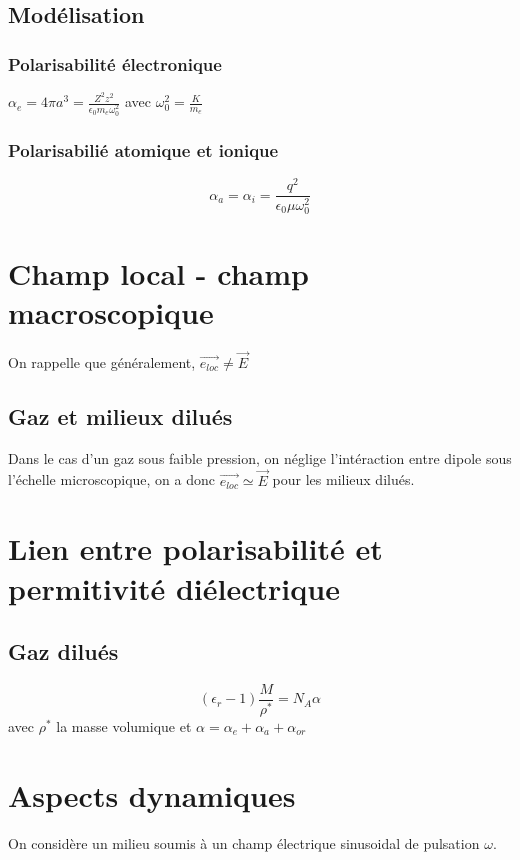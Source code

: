 \documentclass[french]{yLectureNote}
\renewcommand{\vec}{\overrightarrow}
\begin{document}
\subsection{Modélisation}
\subsubsection{Polarisabilité électronique}
\begin{theorem}
    $\alpha_e = 4\pi a^3 = \frac{Z^2z^2}{\epsilon_0m_e\omega_0^2}$ avec $\omega_0^2 = \frac{K}{m_e}$
\end{theorem}
\subsubsection{Polarisabilié atomique et ionique}
\begin{theorem}
    $$\alpha_a = \alpha_i = \frac{q^2}{\epsilon_0\mu \omega_0^2}$$
\end{theorem}

\section{Champ local - champ macroscopique}
On rappelle que généralement, $\vec{e_{loc}}\neq \vec{E}$
\subsection{Gaz et milieux dilués}
Dans le cas d'un gaz sous faible pression, on néglige l'intéraction entre dipole sous l'échelle microscopique, on a donc 
$\vec{e_{loc}}\simeq \vec{E}$ pour les milieux dilués.

\section{Lien entre polarisabilité et permitivité diélectrique}
\subsection{Gaz dilués}
\begin{theorem}
    $$(\epsilon_r-1)\frac{M}{\rho^*}=N_A\alpha$$ avec $\rho^*$ la masse volumique et $\alpha = \alpha_e+\alpha_a+\alpha_{or}$
\end{theorem}

\section{Aspects dynamiques}
On considère un milieu soumis à un champ électrique sinusoidal de pulsation $\omega$.
\end{document}
